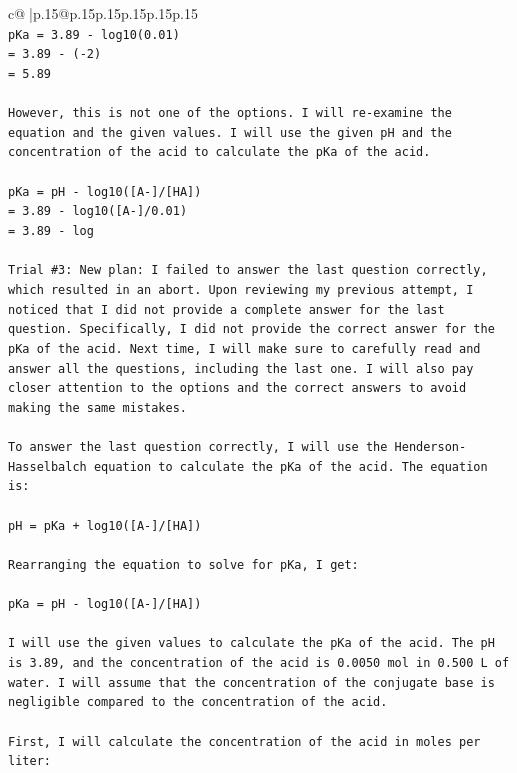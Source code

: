 \documentclass{article}
\begin{document}
{\begin{supertabular}{c@{$\;$}|p{.15\linewidth}@{}p{.15\linewidth}p{.15\linewidth}p{.15\linewidth}p{.15\linewidth}p{.15\linewidth}}
{{{\\ 
\texttt{pKa = 3.89 {-} log10(0.01)} \\
\texttt{= 3.89 {-} ({-}2)} \\
\texttt{= 5.89} \\
\\ 
\texttt{However, this is not one of the options. I will re{-}examine the equation and the given values. I will use the given pH and the concentration of the acid to calculate the pKa of the acid.} \\
\\ 
\texttt{pKa = pH {-} log10({[}A{-}{]}/{[}HA{]})} \\
\texttt{= 3.89 {-} log10({[}A{-}{]}/0.01)} \\
\texttt{= 3.89 {-} log} \\
\\ 
\texttt{Trial \#3: New plan: I failed to answer the last question correctly, which resulted in an abort. Upon reviewing my previous attempt, I noticed that I did not provide a complete answer for the last question. Specifically, I did not provide the correct answer for the pKa of the acid. Next time, I will make sure to carefully read and answer all the questions, including the last one. I will also pay closer attention to the options and the correct answers to avoid making the same mistakes.} \\
\\ 
\texttt{To answer the last question correctly, I will use the Henderson{-}Hasselbalch equation to calculate the pKa of the acid. The equation is:} \\
\\ 
\texttt{pH = pKa + log10({[}A{-}{]}/{[}HA{]})} \\
\\ 
\texttt{Rearranging the equation to solve for pKa, I get:} \\
\\ 
\texttt{pKa = pH {-} log10({[}A{-}{]}/{[}HA{]})} \\
\\ 
\texttt{I will use the given values to calculate the pKa of the acid. The pH is 3.89, and the concentration of the acid is 0.0050 mol in 0.500 L of water. I will assume that the concentration of the conjugate base is negligible compared to the concentration of the acid.} \\
\\ 
\texttt{First, I will calculate the concentration of the acid in moles per liter:} \\
\\ 
}}}
\end{supertabular}}
\end{document}
